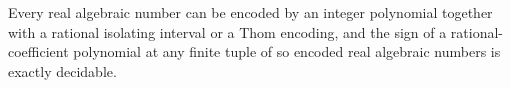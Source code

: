 Every real algebraic number can be encoded by an integer polynomial together with a rational isolating interval or a Thom encoding, and the sign of a rational-coefficient polynomial at any finite tuple of so encoded real algebraic numbers is exactly decidable.